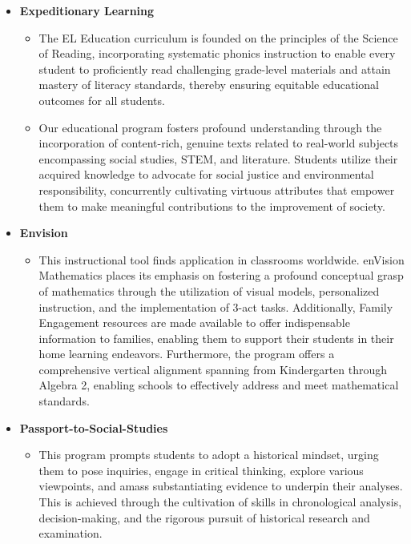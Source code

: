 \documentclass[11pt]{article}
\begin{document}
\begin{itemize}
\item \textbf{Expeditionary Learning}
\begin{itemize}
\item The EL Education curriculum is founded on the principles of the Science of Reading, incorporating systematic phonics instruction to enable every student to proficiently read challenging grade-level materials and attain mastery of literacy standards, thereby ensuring equitable educational outcomes for all students.
\item Our educational program fosters profound understanding through the incorporation of content-rich, genuine texts related to real-world subjects encompassing social studies, STEM, and literature. Students utilize their acquired knowledge to advocate for social justice and environmental responsibility, concurrently cultivating virtuous attributes that empower them to make meaningful contributions to the improvement of society.
\end{itemize}

\item \textbf{Envision}
\begin{itemize}
\item This instructional tool finds application in classrooms worldwide. enVision Mathematics places its emphasis on fostering a profound conceptual grasp of mathematics through the utilization of visual models, personalized instruction, and the implementation of 3-act tasks. Additionally, Family Engagement resources are made available to offer indispensable information to families, enabling them to support their students in their home learning endeavors. Furthermore, the program offers a comprehensive vertical alignment spanning from Kindergarten through Algebra 2, enabling schools to effectively address and meet mathematical standards.
\end{itemize}

\item \textbf{Passport-to-Social-Studies}
\begin{itemize}
\item This program prompts students to adopt a historical mindset, urging them to pose inquiries, engage in critical thinking, explore various viewpoints, and amass substantiating evidence to underpin their analyses. This is achieved through the cultivation of skills in chronological analysis, decision-making, and the rigorous pursuit of historical research and examination.
\end{itemize}


\end{itemize}
\end{document}
